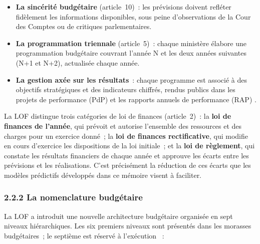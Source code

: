 \begin{itemize}
    \item \textbf{La sinc\'erit\'e budg\'etaire} (article~10)~: les pr\'evisions doivent refl\'eter fid\`element les informations disponibles, sous peine d'observations de la Cour des Comptes ou de critiques parlementaires.

    \item \textbf{La programmation triennale} (article~5)~: chaque minist\`ere \'elabore une programmation budg\'etaire couvrant l'ann\'ee N et les deux ann\'ees suivantes (N+1 et N+2), actualis\'ee chaque ann\'ee.

    \item \textbf{La gestion ax\'ee sur les r\'esultats}~: chaque programme est associ\'e \`a des objectifs strat\'egiques et des indicateurs chiffr\'es, rendus publics dans les projets de performance (PdP) et les rapports annuels de performance (RAP) \citep{Abdelali2019, Khallouk2019}.
\end{itemize}

La LOF distingue trois cat\'egories de loi de finances (article~2)~: la \textbf{loi de finances de l'ann\'ee}, qui pr\'evoit et autorise l'ensemble des ressources et des charges pour un exercice donn\'e~; la \textbf{loi de finances rectificative}, qui modifie en cours d'exercice les dispositions de la loi initiale~; et la \textbf{loi de r\`eglement}, qui constate les r\'esultats financiers de chaque ann\'ee et approuve les \'ecarts entre les pr\'evisions et les r\'ealisations. C'est pr\'ecis\'ement la r\'eduction de ces \'ecarts que les mod\`eles pr\'edictifs d\'evelopp\'es dans ce m\'emoire visent \`a faciliter.

\subsubsection*{2.2.2 \quad La nomenclature budg\'etaire}

La LOF a introduit une nouvelle architecture budg\'etaire organis\'ee en sept niveaux hi\'erarchiques. Les six premiers niveaux sont pr\'esent\'es dans les morasses budg\'etaires~; le septi\`eme est r\'eserv\'e \`a l'ex\'ecution \citep{MEF2015b}~:

